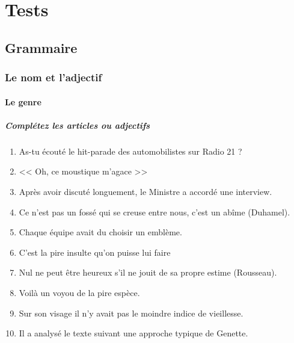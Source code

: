 \documentclass[11pt, french]{report}
\begin{document}
\part{Tests}

\chapter{Grammaire}

\section{Le nom et l'adjectif}

\subsection{Le genre}

\subsubsection{Complétez les articles ou adjectifs}

\vfill

\begin{enumerate}
  \item As-tu écouté le hit-parade des automobilistes sur Radio 21 ?
  \item << Oh, ce moustique m'agace >>
  \item Après avoir discuté longuement, le Ministre a accordé une interview.
  \item Ce n'est pas un fossé qui se creuse entre nous, c'est un abîme (Duhamel).
  \item Chaque équipe avait du choisir un emblème.
  \item C'est la pire insulte qu'on puisse lui faire
  \item Nul ne peut être heureux s'il ne jouit de sa propre estime (Rousseau).
  \item Voilà un voyou de la pire espèce.
  \item Sur son visage il n'y avait pas le moindre indice de vieillesse.
  \item Il a analysé  le texte suivant une approche typique de Genette.
\end{enumerate}

\vfill
\end{document}
